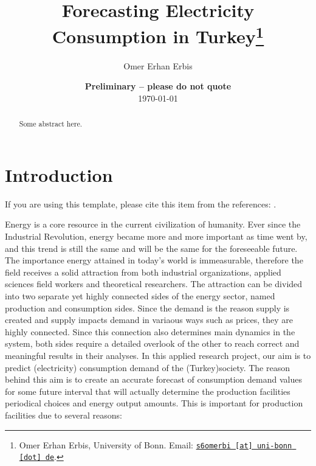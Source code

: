 \documentclass[11pt, a4paper, leqno]{article}
\begin{document}
\title{Forecasting Electricity Consumption in Turkey\thanks{Omer Erhan Erbis, University of Bonn. Email: \href{mailto:s6omerbi@uni-bonn.de}{\nolinkurl{s6omerbi [at] uni-bonn [dot] de}}.}}

\author{Omer Erhan Erbis}

\date{
    {\bf Preliminary -- please do not quote}
    \\[1ex]
    \today
}

\maketitle


\begin{abstract}
    Some abstract here.
\end{abstract}

\clearpage


\section{Introduction} %
\label{sec:introduction}

If you are using this template, please cite this item from the references:
\citet{GaudeckerEconProjectTemplates}.

Energy is a core resource in the current civilization of humanity. Ever since the Industrial Revolution, energy became more and more important as time went by, and this trend is still the same and will be the same for the foreseeable future. The importance energy attained in today’s world is immeasurable, therefore the field receives a solid attraction from both industrial organizations, applied sciences field workers and theoretical researchers.
The attraction can be divided into two separate yet highly connected sides of the energy sector, named production and consumption sides. Since the demand is the reason supply is created and supply impacts demand in variaous ways such as prices, they are highly connected. Since this connection also determines main dynamics in the system, both sides require a detailed overlook of the other to reach correct and meaningful results in their analyses.
In this applied research project, our aim is to predict (electricity) consumption demand of the (Turkey)society. The reason behind this aim is to create an accurate forecast of consumption demand values for some future interval that will actually determine the production facilities periodical choices and energy output amounts.
This is important for production facilities due to several reasons:
\end{document}
